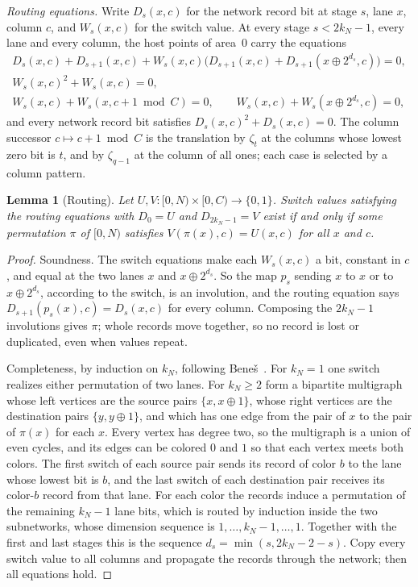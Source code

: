 \documentclass[11pt,letterpaper]{article}
\newtheorem{lemma}[theorem]{Lemma}
\theoremstyle{definition}
\theoremstyle{remark}
\begin{document}
\emph{Routing equations.} Write \(D_s(x,c)\) for the network record bit
at stage \(s\), lane \(x\), column \(c\), and \(W_s(x,c)\) for the switch
value. At every stage \(s<2k_N-1\), every lane and every column, the
host points of area~\(0\) carry the equations
\begin{gather*}
 D_s(x,c)+D_{s+1}(x,c)+W_s(x,c)\bigl(D_{s+1}(x,c)
 +D_{s+1}(x\oplus2^{d_s},c)\bigr)=0,\\
 W_s(x,c)^2+W_s(x,c)=0,\\
 W_s(x,c)+W_s(x,c+1\bmod C)=0,\qquad
 W_s(x,c)+W_s(x\oplus2^{d_s},c)=0,
\end{gather*}
and every network record bit satisfies \(D_s(x,c)^2+D_s(x,c)=0\). The
column successor \(c\mapsto c+1\bmod C\) is the translation by
\(\zeta_t\) at the columns whose lowest zero bit is \(t\), and by
\(\zeta_{q-1}\) at the column of all ones; each case is selected by a
column pattern.

\begin{lemma}[Routing]\label{lem:routing}
Let \(U,V:[0,N)\times[0,C)\to\{0,1\}\). Switch values satisfying the
routing equations with \(D_0=U\) and \(D_{2k_N-1}=V\) exist if and only
if some permutation \(\pi\) of \([0,N)\) satisfies
\(V(\pi(x),c)=U(x,c)\) for all \(x\) and \(c\).
\end{lemma}
\begin{proof}
Soundness. The switch equations make each \(W_s(x,c)\) a bit, constant
in \(c\), and equal at the two lanes \(x\) and \(x\oplus2^{d_s}\). So the
map \(p_s\) sending \(x\) to \(x\) or to \(x\oplus2^{d_s}\), according to
the switch, is an involution, and the routing equation says
\(D_{s+1}(p_s(x),c)=D_s(x,c)\) for every column. Composing the
\(2k_N-1\) involutions gives \(\pi\); whole records move together, so
no record is lost or duplicated, even when values repeat.

Completeness, by induction on \(k_N\), following
Beneš~\cite{Ben65}. For \(k_N=1\)
one switch realizes either permutation of two lanes. For \(k_N\ge2\)
form a bipartite multigraph whose left vertices are the source pairs
\(\{x,x\oplus1\}\), whose right vertices are the destination pairs
\(\{y,y\oplus1\}\), and which has one edge from the pair of \(x\) to the
pair of \(\pi(x)\) for each \(x\). Every vertex has degree two, so the
multigraph is a union of even cycles, and its edges can be colored
\(0\) and \(1\) so that each vertex meets both colors. The first switch
of each source pair sends its record of color \(b\) to the lane whose
lowest bit is \(b\), and the last switch of each destination pair
receives its color-\(b\) record from that lane. For each color the
records induce a permutation of the remaining \(k_N-1\) lane bits,
which is routed by induction inside the two subnetworks, whose
dimension sequence is \(1,\ldots,k_N-1,\ldots,1\). Together with the
first and last stages this is the sequence
\(d_s=\min(s,2k_N-2-s)\). Copy every switch value to all columns and
propagate the records through the network; then all equations hold.
\end{proof}
\end{document}
